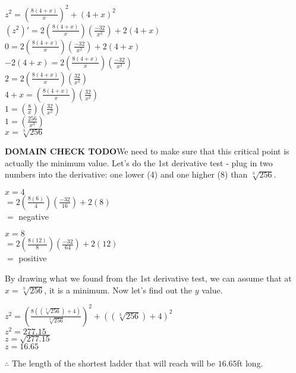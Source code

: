 \documentclass[12pt,fleqn]{book} %
\begin{document}
\begin{center}
    \large{$z^2=(\frac{8(4+x)}{x})^2+(4+x)^2$ \\
        $(z^2)'=2(\frac{8(4+x)}{x})(\frac{-32}{x^2})+2(4+x)$ \\
        $0=2(\frac{8(4+x)}{x})(\frac{-32}{x^2})+2(4+x)$ \\
        $-2(4+x)=2(\frac{8(4+x)}{x})(\frac{-32}{x^2})$ \\
        $2=2(\frac{8(4+x)}{x})(\frac{32}{x^2})$ \\
        $4+x=(\frac{8(4+x)}{x})(\frac{32}{x^2})$ \\
        $1=(\frac{8}{x})(\frac{32}{x^2})$ \\
        $1=(\frac{256}{x^3})$ \\
        $x=\sqrt[3]{256}$}
\end{center}

\noindent \textbf{DOMAIN CHECK TODO}We need to make sure that this critical point is actually the minimum value. Let's do the 1st derivative test - plug in two numbers
into the derivative: one lower (4) and one higher (8) than $\sqrt[3]{256}$.

\begin{multicols}{2}
    \begin{center}
        \underline{$x=4$} \\
        $=2(\frac{8(6)}{4})(\frac{-32}{16})+2(8)$ \\
        $=$ negative

        \columnbreak
        \underline{$x=8$}\\
        $=2(\frac{8(12)}{8})(\frac{-32}{64})+2(12)$ \\
        $=$ positive
    \end{center}
\end{multicols}

\noindent By drawing what we found from the 1st derivative test, we can assume that at $x=\sqrt[3]{256}$, it is a minimum. Now let's find out the $y$ value.

\begin{center}
    $z^2=(\frac{8((\sqrt[3]{256})+4)}{\sqrt[3]{256}})^2+((\sqrt[3]{256})+4)^2$ \\
    $z^2=277.15$ \\
    $z=\sqrt{277.15}$ \\
    $z=16.65$
\end{center}

\noindent $\therefore$ The length of the shortest ladder that will reach will be $16.65$ft long.
\end{document}
